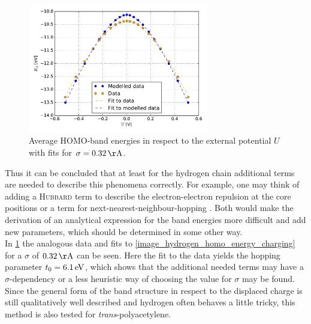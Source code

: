 \begin{figure}[]
	\centering
	\includegraphics[width = 0.7\textwidth]{Images/Hydrogen/charging/Homo_energy_charge_sigma_32}
	\caption{Average HOMO-band energies in respect to the external potential $U$ with fits for $\sigma = \unit[0.32]{\AA}$.}
	\label{image_hydrogen_homo_energy_charging_sigma_32}
\end{figure}
Thus it can be concluded that at least for the hydrogen chain additional terms are needed to describe this phenomena correctly. For example, one may think of adding a \textsc{Hubbard} term to describe the electron-electron repulsion at the core positions or a term for next-nearest-neighbour-hopping \cite{PhysRevLett.103.067004,PhysRevB.82.155141}. Both would make the derivation of an analytical expression for the band energies more difficult and add new parameters, which should be determined in some other way.\\ In \cref{image_hydrogen_homo_energy_charging_sigma_32} the analogous data and fits to \cref{image_hydrogen_homo_energy_charging} for a $\sigma$ of $\unit[0.32]{\AA}$ can be seen. Here the fit to the data yields the hopping parameter $t_0 = \unit[6.1]{eV}$, which shows that the additional needed terms may have a $\sigma$-dependency or a less heuristic way of choosing the value for $\sigma$ may be found.\\
Since the general form of the band structure in respect to the displaced charge is still qualitatively well described and hydrogen often behaves a little tricky, this method is also tested for \emph{trans}-polyacetylene.

